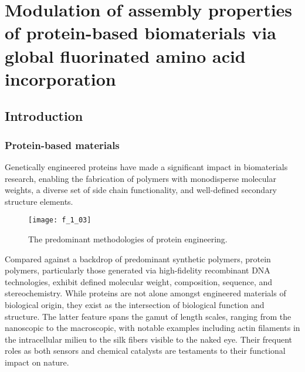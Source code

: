 \chapter{Modulation of assembly properties of protein-based biomaterials via
global fluorinated amino acid incorporation}
\label{chap:pff}

\begin{refsection}

\section{Introduction}

\subsection{Protein-based materials}


Genetically engineered proteins have made a significant impact in biomaterials
research, enabling the fabrication of polymers with monodisperse molecular
weights, a diverse set of side chain functionality, and well-defined secondary
structure elements.\cite{
Yoshikawa1994,Wang2001,Rabotyagova2009,Martin2009,Dinerman2002,Megeed2002,Haider2004,Wright2002,Banta2010,Link2003,Straley2009,Rabotyagova2011}
\begin{figure}[h!] \centering \texttt{[image: f\_1\_03]}
    \caption[The predominant methodologies of protein
        engineering.]{The predominant methodologies of protein
        engineering.\cite{VanHest2001}}\label{fig:protein_engineering_methods} \end{figure}
Compared against a backdrop of predominant synthetic polymers, protein polymers,
particularly those generated via high-fidelity recombinant DNA technologies,
exhibit defined molecular weight, composition, sequence, and
stereochemistry.\cite{VanHest2001} While proteins are not alone amongst
engineered materials of biological origin, they exist as the intersection of
biological function and structure. The latter feature spans the gamut of length
scales, ranging from the nanoscopic to the macroscopic, with notable examples
including actin filaments in the intracellular milieu to the silk fibers visible
to the naked eye.\cite{Rabotyagova2009,Megeed2002,Nagarsekar2002} Their frequent
roles as both sensors and chemical catalysts are testaments to their functional
impact on nature.


\end{refsection}
